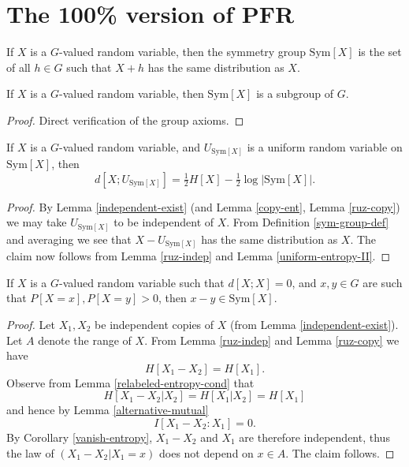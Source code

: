 \chapter{The 100\% version of PFR}

\begin{definition}\label{sym-group-def}
If $X$ is a $G$-valued random variable, then the symmetry group $\mathrm{Sym}[X]$ is the set of all $h \in G$ such that $X+h$ has the same distribution as $X$.
\end{definition}

\begin{lemma}\label{sym-group}
\leanok
If $X$ is a $G$-valued random variable, then $\mathrm{Sym}[X]$ is a subgroup of $G$.
\end{lemma}

\begin{proof} Direct verification of the group axioms.
\end{proof}

\begin{lemma}\label{dist-sym}\leanok  If $X$ is a $G$-valued random variable, and $U_{\mathrm{Sym}[X]}$ is a uniform random variable on $\mathrm{Sym}[X]$, then
$$ d[X; U_{\mathrm{Sym}[X]}] = \tfrac{1}{2} H[X] - \tfrac{1}{2} \log |\mathrm{Sym}[X]|.$$
\end{lemma}

\begin{proof} By Lemma \ref{independent-exist} (and Lemma \ref{copy-ent}, Lemma \ref{ruz-copy}) we may take $U_{\mathrm{Sym}[X]}$ to be independent of $X$.  From Definition \ref{sym-group-def} and averaging we see that $X -U_{\mathrm{Sym}[X]}$ has the same distribution as $X$.  The claim now follows from Lemma \ref{ruz-indep} and Lemma \ref{uniform-entropy-II}.
\end{proof}

\begin{lemma}\label{zero-large}\leanok  If $X$ is a $G$-valued random variable such that
  $d[X;X]=0$, and $x,y \in G$ are such that $P[X=x], P[X=y]>0$, then $x-y \in \mathrm{Sym}[X]$.
\end{lemma}

\begin{proof}
   Let $X_1,X_2$ be independent copies of $X$ (from Lemma \ref{independent-exist}). Let $A$ denote the range of $X$.  From Lemma \ref{ruz-indep} and Lemma \ref{ruz-copy} we have
  $$ H[X_1-X_2] = H[X_1].$$
Observe from Lemma \ref{relabeled-entropy-cond} that
$$ H[X_1-X_2|X_2] = H[X_1|X_2] = H[X_1]$$
and hence by Lemma \ref{alternative-mutual}
$$ I[ X_1-X_2 : X_1 ] = 0.$$
By Corollary \ref{vanish-entropy}, $X_1-X_2$ and $X_1$ are therefore independent, thus the law of $(X_1-X_2|X_1=x)$ does not depend on $x \in A$. The claim follows.
\end{proof}

